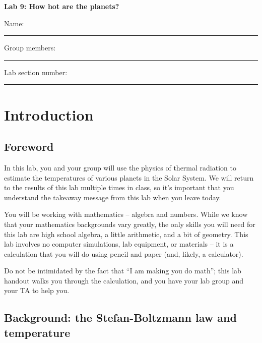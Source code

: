 \documentclass[11pt]{article}
\begin{document}
\begin{center}
\textbf{\Huge
Lab 9: How hot are the planets?\\
\vspace*{0.1cm}
}
\end{center}

\vspace*{0.5cm}

{\Large Name:}\vspace*{0.5cm}\\\hrule
{\Large Group members:}\vspace*{0.5cm}\\\hrule
{\Large Lab section number:}\vspace*{0.5cm}\\\hrule


\section{Introduction}

\subsection*{Foreword}

In this lab, you and your group
will use the physics of thermal radiation to estimate the temperatures of various planets in the Solar System. We will return
to the results of this lab multiple times in class, so it's important that you understand the takeaway message from this lab
when you leave today.

You will be working with mathematics -- algebra and numbers. While we know that your mathematics backgrounds vary greatly, the only skills you will need for this lab are
high school algebra, a little arithmetic, and a bit of geometry. This lab involves no computer simulations, lab equipment, or materials -- it is a calculation that you will do using
pencil and paper (and, likely, a calculator).

Do not be intimidated by the fact that ``I am making you do math''; this lab handout walks you through the calculation, and you have your lab group and your TA to help you.

\subsection*{Background: the Stefan-Boltzmann law and temperature}
\end{document}
